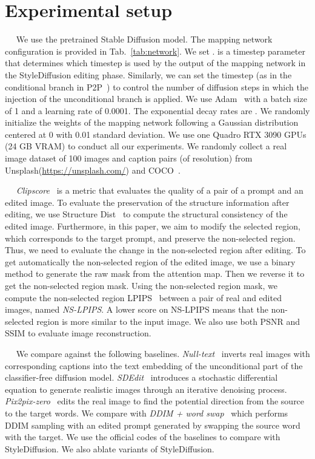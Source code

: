 \documentclass[twocolumn]{svjour3}          \smartqed  \usepackage{graphicx}
\newcommand{\minisection}[1]{\vspace{0.04in} \noindent {\bf #1}\ \ }
\begin{document}
\section{Experimental setup}
\vspace{-2mm}
\minisection{Training details and datasets.} 
We use the pretrained Stable Diffusion model. The mapping network  configuration is provided in Tab.~\ref{tab:network}. We set .  is a timestep parameter that determines which timestep is used by the output of the mapping network in the StyleDiffusion editing phase. Similarly, we can set the timestep  (as in the conditional branch in P2P~\citep{hertz2022prompt}) to control the number of diffusion steps in which the injection of the unconditional branch is applied.
We use Adam~\cite{kingma2014adam} with a batch size of 1 and a learning rate of 0.0001. The exponential decay rates are  . We randomly initialize the weights of the mapping network following a Gaussian distribution centered at 0 with 0.01 standard deviation. We use one Quadro RTX 3090 GPUs (24 GB VRAM) to conduct all our experiments.  We randomly collect a real image dataset of 100 images and caption pairs (of  resolution) from Unsplash(\url{https://unsplash.com/}) and COCO~\citep{chen2015microsoft}.

\minisection{Evaluation metrics.}    \textit{Clipscore}~\citep{hessel2021clipscore} is a metric that evaluates the quality of a pair of a prompt and an edited image. To evaluate the preservation of the structure information after editing,  we use Structure Dist~\citep{tumanyan2022splicing} to compute the structural consistency of the edited image.  Furthermore, in this paper, we aim to modify the selected region, which corresponds to the target prompt, and preserve the non-selected region. Thus, we need to evaluate the change in the non-selected region after editing. To get automatically the non-selected region of the edited image, we use a binary method to generate the raw mask from the attention map. Then we reverse it to get the non-selected region mask. Using the non-selected region mask, we compute the non-selected region LPIPS~\citep{zhang2018unreasonable}  between a pair of real and edited images, named \textit{NS-LPIPS}. A lower score on NS-LPIPS means that the non-selected region is more similar to the input image. We also use both PSNR and SSIM to evaluate image reconstruction.

\minisection{Baselines.}
We compare against the following baselines.
\emph{Null-text}~\citep{mokady2022null}  inverts real images with corresponding captions into the text embedding of the unconditional part of the classifier-free diffusion model.  \emph{SDEdit}~\citep{meng2021sdedit} introduces a stochastic differential equation to generate realistic images through an iterative denoising process.  \emph{Pix2pix-zero}~\citep{parmar2023zero} edits the real image to find the potential direction from the source to the target words.   We compare with \textit{DDIM + word swap}~\citep{parmar2023zero} which performs DDIM sampling with an edited prompt generated by swapping the source word with the target. We use the official codes of the baselines to compare with StyleDiffusion. 
We also ablate variants of StyleDiffusion.
\end{document}
